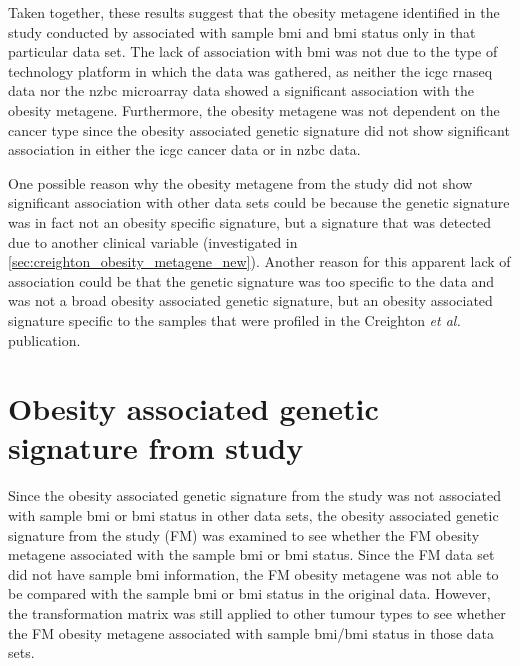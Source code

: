 Taken together, these results suggest that the obesity metagene identified in the study conducted by \citet{Creighton2012} associated with sample \gls{bmi} and \gls{bmi} status only in that particular data set.
The lack of association with \gls{bmi} was not due to the type of technology platform in which the data was gathered, as neither the \gls{icgc} \gls{rnaseq} data nor the \gls{nzbc} microarray data showed a significant association with the obesity metagene.
Furthermore, the obesity metagene was not dependent on the cancer type since the obesity associated genetic signature did not show significant association in either the \gls{icgc} cancer data or in \gls{nzbc} data.

One possible reason why the obesity metagene from the \citet{Creighton2012} study did not show significant association with other data sets could be because the genetic signature was in fact not an obesity specific signature, but a signature that was detected due to another clinical variable (investigated in \cref{sec:creighton_obesity_metagene_new}).
Another reason for this apparent lack of association could be that the genetic signature was too specific to the data and was not a broad obesity associated genetic signature, but an obesity associated signature specific to the samples that were profiled in the Creighton \textit{et al.} publication.

\section{Obesity associated genetic signature from \citet{Fuentes-Mattei2014} study}
\label{sec:fm_obesity_metagene}

Since the obesity associated genetic signature from the \citet{Creighton2012} study was not associated with sample \gls{bmi} or \gls{bmi} status in other data sets, the obesity associated genetic signature from the \citet{Fuentes-Mattei2014} study (FM) was examined to see whether the FM obesity metagene associated with the sample \gls{bmi} or \gls{bmi} status.
Since the FM data set did not have sample \gls{bmi} information, the FM obesity metagene was not able to be compared with the sample \gls{bmi} or \gls{bmi} status in the original data.
However, the transformation matrix was still applied to other tumour types to see whether the FM obesity metagene associated with sample \gls{bmi}/\gls{bmi} status in those data sets.

